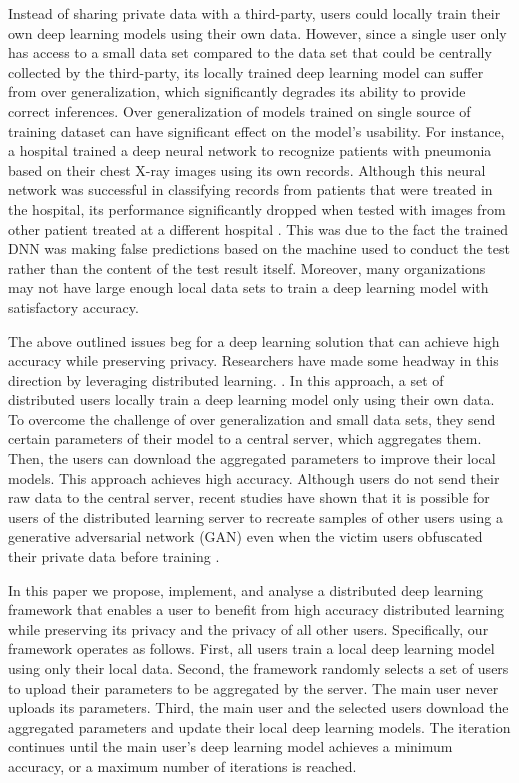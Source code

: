 \documentclass[conference]{IEEEtran}
\begin{document}
Instead of sharing private data with a third-party, users could locally train their own deep learning models using their own
data. However, since a single user only has access to a small data set compared to the data set that could be centrally
collected by the third-party, its locally trained deep learning model can suffer from over generalization, which significantly
degrades its ability to provide correct inferences. 
Over generalization of models trained on single source of training dataset can have significant
effect on the model's usability. 
For instance, a hospital trained a deep neural network to recognize patients with pneumonia based on their
chest X-ray images using its own records. Although this neural network was successful in classifying records from patients that were
treated in the hospital, its performance significantly dropped when tested with images from other patient treated at a different
hospital \cite{zech2018variable}. This was due to the fact the trained DNN was making false predictions based on the machine used to conduct the test rather than the content of the test result itself.
Moreover, many organizations may not have large enough local data sets to train a deep learning model with satisfactory
accuracy. 
 
The above outlined issues beg for a deep learning solution that can achieve high accuracy while preserving privacy. 
Researchers have made some headway in this direction by leveraging distributed learning. 
\cite{shokri2015privacy}.
In this approach, a set of distributed users locally
train a deep learning model only using their own data. To overcome the challenge of over generalization and small
data sets, they send certain parameters of their model to a central server, which aggregates them. 
Then, the users can download the aggregated parameters to improve their local models. This approach achieves high accuracy.
Although users do not send their raw data to the central server, recent studies have shown that it is possible for users of the
distributed learning server to recreate samples of other users using a generative adversarial network (GAN) even when the victim users 
obfuscated their private data before training \cite{hitaj2017deep}.

In this paper we propose, implement, and analyse a distributed deep learning framework that enables a user to benefit from 
high accuracy distributed learning while preserving its privacy and the privacy of all other users. 
Specifically, our framework operates as follows. First, all users train a local deep learning model using only their local data.
Second, the framework randomly selects a set of users to upload their parameters to be aggregated by the server. The main user
never uploads its parameters. Third, the main user and the selected users download the aggregated parameters and update their local
deep learning models. The iteration continues until the main user's deep learning model achieves a minimum
accuracy, or a maximum number of iterations is reached.
\end{document}
